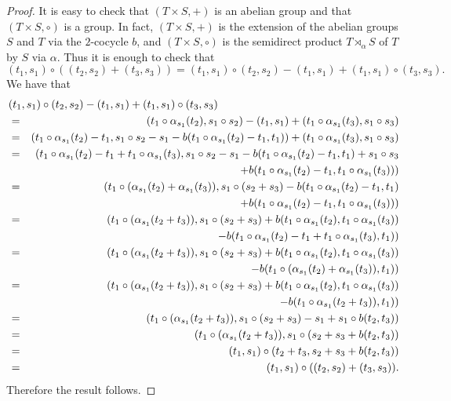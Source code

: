 \begin{proof}
	It is easy to check that $(T\times S,+)$ is an abelian group and that $(T\times S,\circ)$ is a group. In fact, 
	$(T\times S,+)$ is the extension of the abelian groups $S$ and $T$ via the $2$-cocycle $b$, and $(T\times S, \circ)$ is the semidirect product $T\rtimes_{\alpha}S$ of $T$ by $S$ via $\alpha$. Thus it is enough to check that
	$$(t_1,s_1)\circ ((t_2,s_2)+(t_3,s_3))=(t_1,s_1)\circ (t_2,s_2)-(t_1,s_1)+(t_1,s_1)\circ (t_3,s_3).$$
	We have that
	\begin{eqnarray*}
		\lefteqn{(t_1,s_1)\circ (t_2,s_2)-(t_1,s_1)+(t_1,s_1)\circ (t_3,s_3)}\\
		&=&(t_1\circ\alpha_{s_1}(t_2),s_1\circ s_2)-(t_1,s_1)+(t_1\circ\alpha_{s_1}(t_3),s_1\circ s_3)\\
		&=&(t_1\circ\alpha_{s_1}(t_2)-t_1,s_1\circ s_2-s_1-b(t_1\circ\alpha_{s_1}(t_2)-t_1,t_1))+(t_1\circ\alpha_{s_1}(t_3),s_1\circ s_3)\\
		&=&(t_1\circ\alpha_{s_1}(t_2)-t_1+t_1\circ\alpha_{s_1}(t_3),s_1\circ s_2-s_1-b(t_1\circ\alpha_{s_1}(t_2)-t_1,t_1)+s_1\circ s_3\\
		&&\qquad+b(t_1\circ\alpha_{s_1}(t_2)-t_1,t_1\circ\alpha_{s_1}(t_3)))\\
        &=&(t_1\circ(\alpha_{s_1}(t_2)+\alpha_{s_1}(t_3)),s_1\circ (s_2+s_3)-b(t_1\circ\alpha_{s_1}(t_2)-t_1,t_1)\\
        &&\qquad+b(t_1\circ\alpha_{s_1}(t_2)-t_1,t_1\circ\alpha_{s_1}(t_3)))\\
        &=&(t_1\circ(\alpha_{s_1}(t_2+t_3)),s_1\circ (s_2+s_3)+b(t_1\circ\alpha_{s_1}(t_2),t_1\circ\alpha_{s_1}(t_3))\\
        &&\qquad-b(t_1\circ\alpha_{s_1}(t_2)-t_1+t_1\circ\alpha_{s_1}(t_3),t_1))\\
        &=&(t_1\circ(\alpha_{s_1}(t_2+t_3)),s_1\circ (s_2+s_3)+b(t_1\circ\alpha_{s_1}(t_2),t_1\circ\alpha_{s_1}(t_3))\\
        &&\qquad-b(t_1\circ(\alpha_{s_1}(t_2)+\alpha_{s_1}(t_3)),t_1))\\
        &=&(t_1\circ(\alpha_{s_1}(t_2+t_3)),s_1\circ (s_2+s_3)+b(t_1\circ\alpha_{s_1}(t_2),t_1\circ\alpha_{s_1}(t_3))\\
        &&\qquad-b(t_1\circ\alpha_{s_1}(t_2+t_3)),t_1))\\
        &=&(t_1\circ(\alpha_{s_1}(t_2+t_3)),s_1\circ (s_2+s_3)-s_1+s_1\circ b(t_2,t_3))\\
        &=&(t_1\circ(\alpha_{s_1}(t_2+t_3)),s_1\circ (s_2+s_3+b(t_2,t_3))\\
        &=&(t_1,s_1)\circ (t_2+t_3,s_2+s_3+b(t_2,t_3))\\
        &=&(t_1,s_1)\circ ((t_2,s_2)+(t_3,s_3)).
	\end{eqnarray*}	
Therefore the result follows.
\end{proof}

